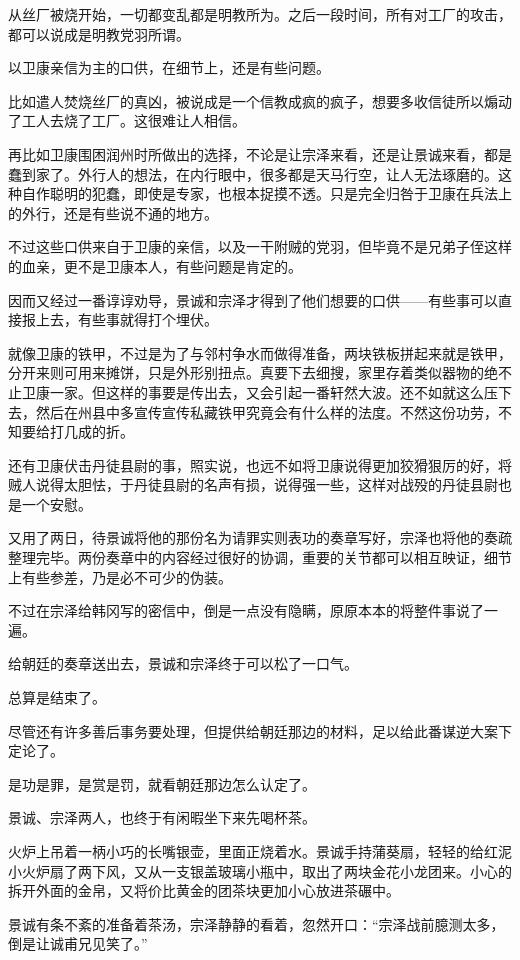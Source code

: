 从丝厂被烧开始，一切都变乱都是明教所为。之后一段时间，所有对工厂的攻击，都可以说成是明教党羽所谓。

以卫康亲信为主的口供，在细节上，还是有些问题。

比如遣人焚烧丝厂的真凶，被说成是一个信教成疯的疯子，想要多收信徒所以煽动了工人去烧了工厂。这很难让人相信。

再比如卫康围困润州时所做出的选择，不论是让宗泽来看，还是让景诚来看，都是蠢到家了。外行人的想法，在内行眼中，很多都是天马行空，让人无法琢磨的。这种自作聪明的犯蠢，即使是专家，也根本捉摸不透。只是完全归咎于卫康在兵法上的外行，还是有些说不通的地方。

不过这些口供来自于卫康的亲信，以及一干附贼的党羽，但毕竟不是兄弟子侄这样的血亲，更不是卫康本人，有些问题是肯定的。

因而又经过一番谆谆劝导，景诚和宗泽才得到了他们想要的口供——有些事可以直接报上去，有些事就得打个埋伏。

就像卫康的铁甲，不过是为了与邻村争水而做得准备，两块铁板拼起来就是铁甲，分开来则可用来摊饼，只是外形别扭点。真要下去细搜，家里存着类似器物的绝不止卫康一家。但这样的事要是传出去，又会引起一番轩然大波。还不如就这么压下去，然后在州县中多宣传宣传私藏铁甲究竟会有什么样的法度。不然这份功劳，不知要给打几成的折。

还有卫康伏击丹徒县尉的事，照实说，也远不如将卫康说得更加狡猾狠厉的好，将贼人说得太胆怯，于丹徒县尉的名声有损，说得强一些，这样对战殁的丹徒县尉也是一个安慰。

又用了两日，待景诚将他的那份名为请罪实则表功的奏章写好，宗泽也将他的奏疏整理完毕。两份奏章中的内容经过很好的协调，重要的关节都可以相互映证，细节上有些参差，乃是必不可少的伪装。

不过在宗泽给韩冈写的密信中，倒是一点没有隐瞒，原原本本的将整件事说了一遍。

给朝廷的奏章送出去，景诚和宗泽终于可以松了一口气。

总算是结束了。

尽管还有许多善后事务要处理，但提供给朝廷那边的材料，足以给此番谋逆大案下定论了。

是功是罪，是赏是罚，就看朝廷那边怎么认定了。

景诚、宗泽两人，也终于有闲暇坐下来先喝杯茶。

火炉上吊着一柄小巧的长嘴银壶，里面正烧着水。景诚手持蒲葵扇，轻轻的给红泥小火炉扇了两下风，又从一支银盖玻璃小瓶中，取出了两块金花小龙团来。小心的拆开外面的金帛，又将价比黄金的团茶块更加小心放进茶碾中。

景诚有条不紊的准备着茶汤，宗泽静静的看着，忽然开口：“宗泽战前臆测太多，倒是让诚甫兄见笑了。”

